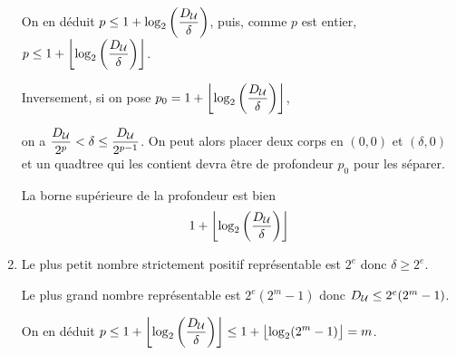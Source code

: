 \begin{Exercise}[title=Propriétés des quadtrees]
\begin{enumerate}
    On en déduit $\displaystyle p\le 1 + \log_2\left(\frac{D_{\cal U}}{\delta}\right)$, puis, comme $p$ est entier, $\displaystyle p\le 1 + \left\lfloor\log_2\left(\frac{D_{\cal U}}{\delta}\right)\right\rfloor$.
    
\begin{minipage}{0.6\textwidth}
    Inversement, si on pose $\displaystyle p_0 = 1 + \left\lfloor\log_2\left(\frac{D_{\cal U}}{\delta}\right)\right\rfloor$, 
    
    on a $\displaystyle \frac {D_{\cal U}}{2^{p}}< \delta \le  \frac {D_{\cal U}}{2^{p-1}}$. On peut alors placer deux corps en $(0,0)$ et $(\delta, 0)$ et un quadtree qui les contient devra être de profondeur $p_0$ pour les séparer.
    
    La borne supérieure de la profondeur est bien 
    \[1 + \left\lfloor\log_2\left(\frac{D_{\cal U}}{\delta}\right)\right\rfloor\]
\end{minipage}
\begin{minipage}{0.4\textwidth}
    \begin{center}
    \end{center}
\end{minipage}
    \item Le plus petit nombre strictement positif représentable est $2^e$ donc
$\delta \ge 2^e$.

Le plus grand nombre représentable est $2^e(2^m-1)$ donc $D_{\cal U} \le 2^e(2^m-1)$.

On en déduit $\displaystyle p\le 1 + \left\lfloor\log_2\left(\frac{D_{\cal U}}{\delta}\right)\right\rfloor \le 1 + \bigl\lfloor\log_2(2^m-1)\bigr\rfloor = m$.
\end{enumerate}
\end{Exercise}
